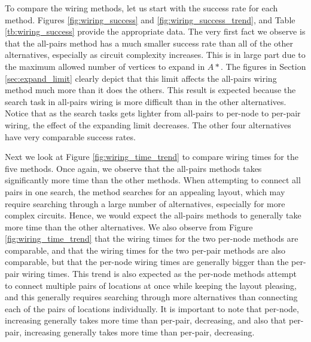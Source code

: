 To compare the wiring methods, let us start with the success rate for each method.
Figures \ref{fig:wiring_success} and \ref{fig:wiring_success_trend}, and Table
\ref{tb:wiring_success} provide the appropriate data. The very first fact we
observe is that the all-pairs method has a much smaller success rate than all of
the other alternatives, especially as circuit complexity increases. This is in
large part due to the maximum allowed number of vertices to expand in $A*$. The
figures in Section \ref{sec:expand_limit} clearly depict that this limit affects
the all-pairs wiring method much more than it does the others. This result is
expected because the search task in all-pairs wiring is more difficult than in
the other alternatives. Notice that as the search tasks gets lighter from
all-pairs to per-node to per-pair wiring, the effect of the expanding limit
decreases. The other four alternatives have very comparable success rates.

Next we look at Figure \ref{fig:wiring_time_trend} to compare wiring times for
the five methods. Once again, we observe that the all-pairs methods takes
significantly more time than the other methods. When attempting to connect all
pairs in one search, the method searches for an appealing layout, which may
require searching through a large number of alternatives, especially for more
complex circuits. Hence, we would expect the all-pairs methods to generally take
more time than the other alternatives. We also observe from Figure
\ref{fig:wiring_time_trend} that the wiring times for the two per-node methods
are comparable, and that the wiring times for the two per-pair methods are also
comparable, but that the per-node wiring times are generally bigger than the
per-pair wiring times. This trend is also expected as the per-node methods
attempt to connect multiple pairs of locations at once while keeping the layout
pleasing, and this generally requires searching through more alternatives than
connecting each of the pairs of locations individually. It is important to note
that per-node, increasing generally takes more time than per-pair, decreasing,
and also that per-pair, increasing generally takes more time than per-pair,
decreasing.

